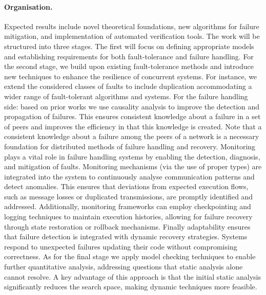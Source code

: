 \documentclass{article}
\theoremstyle{definition}
\theoremstyle{definition}
\begin{document}
\paragraph{Organisation.} Expected results include novel theoretical foundations, new algorithms for failure mitigation, and implementation of automated verification tools.
The work will be structured into three stages. The first will focus on defining appropriate models and establishing requirements for both fault-tolerance and failure handling. For the second stage,  we build upon existing fault-tolerance methods and introduce new techniques to enhance the resilience of concurrent systems. For instance,  we extend the considered classes of faults to include duplication accommodating a wider range of fault-tolerant algorithms and systems. For the  failure handling side: based on prior works we use causality analysis to improve the detection and propagation of failures. This ensures consistent knowledge about a failure in a set of peers and improves the efficiency in that this knowledge is created. Note that a consistent knowledge about a failure among the peers of a network is a necessary foundation for distributed methods of failure handling and recovery.  Monitoring  plays a vital role in failure handling systems by enabling the detection, diagnosis, and mitigation of faults. Monitoring mechanisms (via the use of proper types) are integrated into the system to continuously analyse communication patterns and detect anomalies. This ensures that deviations from expected execution flows, such as message losses or duplicated transmissions, are promptly identified and addressed. Additionally, monitoring frameworks can employ checkpointing and logging techniques to maintain execution histories, allowing for failure recovery through state restoration or rollback mechanisms.
Finally  adaptability ensures that failure detection is integrated with dynamic recovery strategies. Systems respond to unexpected failures updating their code without compromising correctness. As for the final stage we apply model checking techniques to enable further quantitative analysis, addressing questions that static analysis alone cannot resolve. A key advantage of this approach is that the initial static analysis significantly reduces the search space, making dynamic techniques more feasible. 
\end{document}
